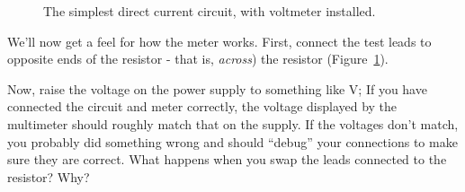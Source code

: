 \documentclass[12pt]{article}
\begin{document}
\begin{enumerate}
\begin{figure}
    \caption{The simplest direct current circuit, with voltmeter installed.}
    \label{fig:simplest_with_voltmeter}
  \end{figure}
  We'll now get a feel for how the meter works.  First, connect the
  test leads to opposite ends of the resistor - that is,
  \textit{across}) the resistor
  (Figure~\ref{fig:simplest_with_voltmeter}).
  
  Now, raise the voltage on the power supply to something like
  \unit[10]{V}; If you have connected the circuit and meter correctly,
  the voltage displayed by the multimeter should roughly match that on
  the supply.  If the voltages don't match, you probably did something
  wrong and should ``debug'' your connections to make sure they are
  correct.  What happens when you swap the leads connected to the
  resistor?  Why?


\end{enumerate}
\end{document}
